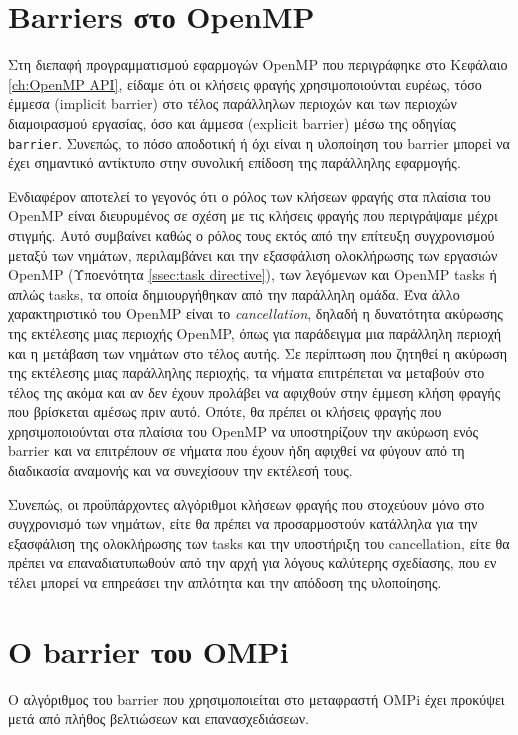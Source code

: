\section{Barriers στο OpenMP}
\label{sec:Barriers in OpenMP}
Στη διεπαφή προγραμματισμού εφαρμογών OpenMP που περιγράφηκε στο Κεφάλαιο \ref{ch:OpenMP API}, είδαμε ότι οι κλήσεις φραγής χρησιμοποιούνται ευρέως, τόσο έμμεσα (implicit barrier) στο τέλος παράλληλων περιοχών και των περιοχών διαμοιρασμού εργασίας, όσο και άμμεσα (explicit barrier) μέσω της οδηγίας \texttt{barrier}. Συνεπώς, το πόσο αποδοτική ή όχι είναι η υλοποίηση του barrier μπορεί να έχει σημαντικό αντίκτυπο στην συνολική επίδοση της παράλληλης εφαρμογής. %

Ενδιαφέρον αποτελεί το γεγονός ότι ο ρόλος των κλήσεων φραγής στα πλαίσια του OpenMP είναι διευρυμένος σε σχέση με τις κλήσεις φραγής που περιγράψαμε μέχρι στιγμής. Αυτό συμβαίνει καθώς ο ρόλος τους εκτός από την επίτευξη συγχρονισμού μεταξύ των νημάτων, περιλαμβάνει και την εξασφάλιση ολοκλήρωσης των εργασιών OpenMP (Υποενότητα \ref{ssec:task directive}), των λεγόμενων και OpenMP tasks ή απλώς tasks, τα οποία δημιουργήθηκαν από την παράλληλη ομάδα. Ένα άλλο χαρακτηριστικό του OpenMP είναι το \textit{cancellation}, δηλαδή η δυνατότητα ακύρωσης της εκτέλεσης μιας περιοχής OpenMP, όπως για παράδειγμα μια παράλληλη περιοχή και η μετάβαση των νημάτων στο τέλος αυτής. Σε περίπτωση που ζητηθεί η ακύρωση της εκτέλεσης μιας παράλληλης περιοχής, τα νήματα επιτρέπεται να μεταβούν στο τέλος της ακόμα και αν δεν έχουν προλάβει να αφιχθούν στην έμμεση κλήση φραγής που βρίσκεται αμέσως πριν αυτό. Οπότε, θα πρέπει οι κλήσεις φραγής που χρησιμοποιούνται στα πλαίσια του OpenMP να υποστηρίζουν την ακύρωση ενός barrier και να επιτρέπουν σε νήματα που έχουν ήδη αφιχθεί να φύγουν από τη διαδικασία αναμονής και να συνεχίσουν την εκτέλεσή τους.

Συνεπώς, οι προϋπάρχοντες αλγόριθμοι κλήσεων φραγής που στοχεύουν μόνο στο συγχρονισμό των νημάτων, είτε θα πρέπει να προσαρμοστούν κατάλληλα για την εξασφάλιση της ολοκλήρωσης των tasks και την υποστήριξη του cancellation, είτε θα πρέπει να επαναδιατυπωθούν από την αρχή για λόγους καλύτερης σχεδίασης, που εν τέλει μπορεί να επηρεάσει την απλότητα και την απόδοση της υλοποίησης.

\section{Ο barrier του OMPi}
\label{sec:OMPi's barrier}
Ο αλγόριθμος του barrier που χρησιμοποιείται στο μεταφραστή OMPi έχει προκύψει μετά από πλήθος βελτιώσεων και επανασχεδιάσεων.


